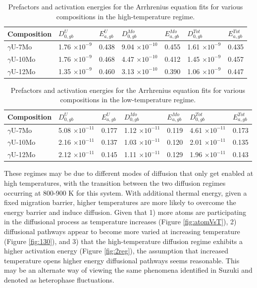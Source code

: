 \documentclass{elsarticle}
\begin{document}
\begin{table}[!ht]
\centering
\caption{Prefactors and activation energies for the Arrhrenius equation fits for various compositions in the high-temperature regime.}
\label{tab:compArrHigh}
\begin{tabular}{lllllll}
\toprule
Composition & $D_{0,gb}^U$      & $E_{a,gb}^U$
	    & $D_{0,gb}^{Mo}$   & $E_{a,gb}^{Mo}$
	    & $D_{0,gb}^{Tot}$  & $E_{a,gb}^{Tot}$ \\
\midrule
$\gamma$U-7Mo  & 1.76 $\times 10^{-9}$ & 0.438 & 9.04 $\times 10^{-10}$
	       & 0.455 & 1.61 $\times 10^{-9}$ & 0.435  \\
$\gamma$U-10Mo & 1.76 $\times 10^{-9}$ & 0.468 & 4.47 $\times 10^{-10}$
	       & 0.412 & 1.45 $\times 10^{-9}$ & 0.457  \\
$\gamma$U-12Mo & 1.35 $\times 10^{-9}$ & 0.460 & 3.13 $\times 10^{-10}$
	       & 0.390 & 1.06 $\times 10^{-9}$ & 0.447  \\
\bottomrule
\end{tabular}
\end{table}

\begin{table}[!ht]
\centering
\caption{Prefactors and activation energies for the Arrhrenius equation fits for various compositions in the low-temperature regime.}
\label{tab:compArrLow}
\begin{tabular}{lllllll}
\toprule
Composition & $D_{0,gb}^U$      & $E_{a,gb}^U$
	    & $D_{0,gb}^{Mo}$   & $E_{a,gb}^{Mo}$
	    & $D_{0,gb}^{Tot}$  & $E_{a,gb}^{Tot}$ \\
\midrule
$\gamma$U-7Mo  & 5.08 $\times 10^{-11}$ & 0.177 & 1.12 $\times 10^{-11}$
	       & 0.119 & 4.61 $\times 10^{-11}$ & 0.173  \\
$\gamma$U-10Mo & 2.16 $\times 10^{-11}$ & 0.137 & 1.03 $\times 10^{-11}$
	       & 0.120 & 2.01 $\times 10^{-11}$ & 0.135  \\
$\gamma$U-12Mo & 2.12 $\times 10^{-11}$ & 0.145 & 1.11 $\times 10^{-11}$
	       & 0.129 & 1.96 $\times 10^{-11}$ & 0.143  \\
\bottomrule
\end{tabular}
\end{table}

These regimes may be due to different modes of diffusion that only get enabled at high temperatures, with the transition between the two diffusion regimes occurring at 800-900 K for this system. With additional thermal energy, given a fixed migration barrier, higher temperatures are more likely to overcome the energy barrier and induce diffusion. Given that 1) more atoms are participating in the diffusional process as temperature increases (Figure \ref{fig:atomVsT}), 2) diffusional pathways appear to become more varied at increasing temperature (Figure \ref{fig:130}), and 3) that the high-temperature diffusion regime exhibits a higher activation energy (Figure \ref{fig:2reg}), the assumption that increased temperature opens higher energy diffusional pathways seems reasonable. This may be an alternate way of viewing the same phenomena identified in Suzuki \cite{suzuki2005} and denoted as heterophase fluctuations. 
\end{document}
